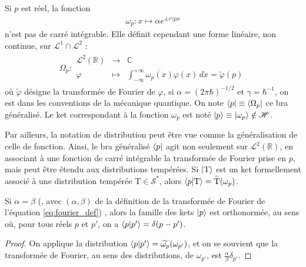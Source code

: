 \begin{Defi} Si $p$ est réel, la fonction
    \begin{eqnarray}
        \omega_p \colon x \mapsto \alpha e^{\pm i \gamma p x } 
    \end{eqnarray} 
    n'est pas de carré intégrable. Elle définit cependant une forme linéaire, non continue, sur $\mathcal L^1 \cap \mathcal L^2$ :
    \begin{eqnarray}
        \Omega_p \colon \left . 
        \begin{array}{rcl}
            \mathcal L^2(\mathbb R) & \longrightarrow & \mathbb C \\
            \varphi & \longmapsto & \displaystyle \int_{-\infty}^{+ \infty} \overline{\omega_p(x)} \varphi(x) \, dx = \tilde \varphi (p) 
        \end{array}
        \right .
    \end{eqnarray}
    où $\tilde \varphi$ désigne la transformée de Fourier de $\varphi$, si $\alpha = (2\pi \hbar )^{-1/2}$ et $\gamma = \hbar^{-1}$, on est dans les conventions de la mécanique quantique. On note $\bra{p} \equiv \bra{\Omega_p}$ ce bra généralisé. Le ket correspondant à la fonction $\omega_p$ est noté $\ket{p} \equiv \ket{\omega_p} \notin \mathscr H$.\\
\end{Defi}

Par ailleurs, la notation de distribution peut être vue comme la généralisation de celle de fonction. Ainsi, le bra généralisé $\bra{p}$ agit non seulement sur $\mathcal L^2(\mathbb R)$, en associant à une fonction de carré intégrable la transformée de Fourier prise en $p$, mais peut être étendu aux distributions tempérées. Si $\ket{\mathrm T}$ est un ket formellement associé à une distribution tempérée $\mathrm T \in \mathscr S^\ast$, alors $\braket{p \vert \mathrm T} = \widetilde{\mathrm T}(\omega_p)$.

\begin{Theo}
    Si $\alpha = \beta$ (, avec $(\alpha , \beta)$ de la définition de la transformée de Fourier de l'équation \eqref{eq:fourier_def}) , alors la famille des kets $\ket{p}$ est orthonormée, au sens où, pour tous réels $p$ et $p'$, on a $\braket{p\vert p'} = \delta ( p -p')$.
\end{Theo}
\begin{proof}
    On applique la distribution $\braket{p\vert p'} = \widetilde{\omega_p}(\omega_{p'})$, et on se souvient que la transformée de Fourier, au sens des distributions, de $\omega_{p'}$, est $\frac{\alpha}\beta \delta_{p'}$.
\end{proof}

